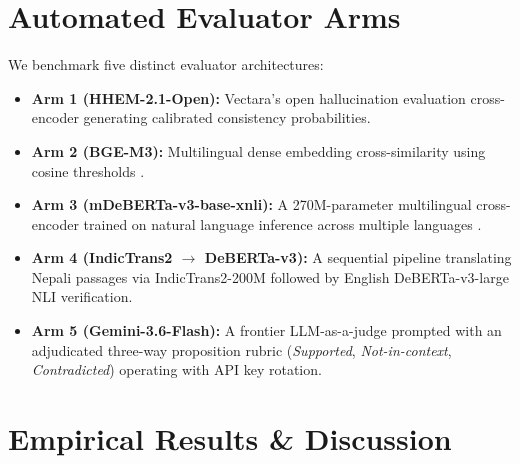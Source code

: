 \documentclass[conference]{IEEEtran}
\begin{document}
\section{Automated Evaluator Arms}
\label{sec:evaluators}
We benchmark five distinct evaluator architectures:
\begin{itemize}
    \item \textbf{Arm 1 (HHEM-2.1-Open):} Vectara's open hallucination evaluation cross-encoder generating calibrated consistency probabilities.
    \item \textbf{Arm 2 (BGE-M3):} Multilingual dense embedding cross-similarity using cosine thresholds \cite{chen2024bgem3}.
    \item \textbf{Arm 3 (mDeBERTa-v3-base-xnli):} A 270M-parameter multilingual cross-encoder trained on natural language inference across multiple languages \cite{laurer2022mdeberta}.
    \item \textbf{Arm 4 (IndicTrans2 $\to$ DeBERTa-v3):} A sequential pipeline translating Nepali passages via IndicTrans2-200M \cite{gala2023indictrans2} followed by English DeBERTa-v3-large NLI verification.
    \item \textbf{Arm 5 (Gemini-3.6-Flash):} A frontier LLM-as-a-judge prompted with an adjudicated three-way proposition rubric (\textit{Supported}, \textit{Not-in-context}, \textit{Contradicted}) operating with API key rotation.
\end{itemize}

\section{Empirical Results \& Discussion}
\label{sec:results}
\end{document}

